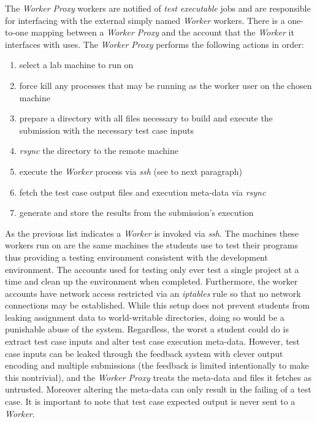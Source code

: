 The \emph{Worker Proxy} workers are notified of \emph{test executable} jobs and
are responsible for interfacing with the external simply named \emph{Worker}
workers. There is a one-to-one mapping between a \emph{Worker Proxy} and the
account that the \emph{Worker} it interfaces with uses. The \emph{Worker Proxy}
performs the following actions in order:

\begin{enumerate}
\item select a lab machine to run on
\item force kill any processes that may be running as the worker user on the
  chosen machine
\item prepare a directory with all files necessary to build and execute the
  submission with the necessary test case inputs
\item \emph{rsync} the directory to the remote machine
\item execute the \emph{Worker} process via \emph{ssh} (see to next paragraph)
\item fetch the test case output files and execution meta-data via \emph{rsync}
\item generate and store the results from the submission's execution
\end{enumerate}

As the previous list indicates a \emph{Worker} is invoked via \emph{ssh}. The
machines these workers run on are the same machines the students use to test
their programs thus providing a testing environment consistent with the
development environment. The accounts used for testing only ever test a single
project at a time and clean up the environment when completed. Furthermore, the
worker accounts have network access restricted via an \emph{iptables} rule so
that no network connections may be established. While this setup does not
prevent students from leaking assignment data to world-writable directories,
doing so would be a punishable abuse of the system. Regardless, the worst a
student could do is extract test case inputs and alter test case execution
meta-data. However, test case inputs can be leaked through the feedback system
with clever output encoding and multiple submissions (the feedback is limited
intentionally to make this nontrivial), and the \emph{Worker Proxy} treats the
meta-data and files it fetches as untrusted. Moreover altering the meta-data
can only result in the failing of a test case. It is important to note that
test case expected output is never sent to a \emph{Worker}.
